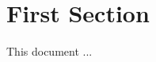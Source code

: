 \documentclass[a4paper,10pt]{article}
\begin{document}
 
\tableofcontents
 
\section{First Section}
This document ...
 


 
\end{document}
